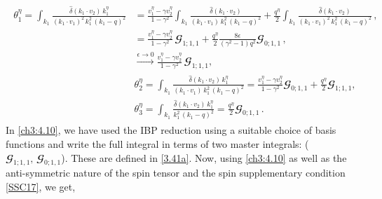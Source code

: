 \begin{align}
    \begin{split}
        \theta_1^{\eta}=\int_{k_1}\frac{\hat\delta(k_1\cdot v_2)\,k_1^\eta}{(k_1\cdot v_1)^2\,k_1^2\,(k_1-q)^2}&=\frac{v_1^\eta-\gamma v_2^\eta}{1-\gamma^2}\int_{k_1}\frac{\hat\delta(k_1\cdot v_2)}{(k_1\cdot v_1)\,k_1^2\,(k_1-q)^2}+\frac{q^\eta}{2}\int_{k_1}\frac{\hat\delta(k_1\cdot v_2)}{(k_1\cdot v_1)^2\,k_1^2\,(k_1-q)^2}\,,\\ &
        =\frac{v_1^\eta-\gamma v_2^\eta}{1-\gamma^2} \,\mathbfcal{G}_{1;1,1}+\frac{q^\eta}{2}\frac{8 \epsilon } {(\gamma^2 -1) q^2}\mathbfcal{G}_{0;1,1}\,,\\ &
        \xrightarrow[]{\epsilon\to 0}\frac{v_1^\eta-\gamma v_2^\eta}{1-\gamma^2} \,\mathbfcal{G}_{1;1,1},\\ &
        \hspace{0cm}
        \theta_2^\eta =\int_{k_1}\frac{\hat\delta(k_1\cdot v_2)\,k_1^\eta}{(k_1\cdot v_1)\,k_1^2\,(k_1-q)^2}=\frac{v_1^\eta-\gamma v_2^\eta}{1-\gamma^2}\mathbfcal{G}_{0;1,1}+\frac{q^\eta}{2} \mathbfcal{G}_{1;1,1},\,\,\\&  \hspace{0cm}\theta_3^\eta=\int_{k_1}\frac{\hat\delta(k_1\cdot v_2)\,k_1^\eta}{k_1^2\,(k_1-q)^2}=\frac{q^\eta}{2}\mathbfcal{G}_{0;1,1}\,.
    \end{split}\label{ch3:4.10}
\end{align}
 In \eqref{ch3:4.10}, we have used the IBP reduction using a suitable choice of basis functions and write the full integral in terms of two master integrals: ($\mathbfcal{G}_{1;1,1},\,\mathbfcal{G}_{0;1,1}$). These are defined in \eqref{3.41a}. 
Now, using \eqref{ch3:4.10} as well as the anti-symmetric nature of the spin tensor and the spin supplementary condition {\eqref{SSC17}}, we get,


